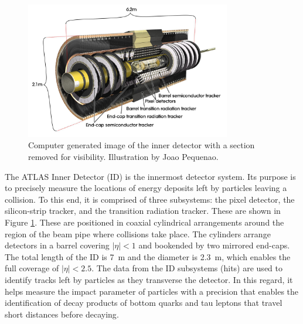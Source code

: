 \begin{figure}[h!]
\captionsetup[subfigure]{position=b}
\centering
\includegraphics[width=0.8\textwidth]{figures/experiment/atlas/id.jpg}
\caption[Computer generated image of the inner detector with a section removed for visibility. Illustration by Joao Pequenao.]{Computer generated image of the inner detector with a section removed for visibility. Illustration by Joao Pequenao\footnotemark.}
\label{fig:atlasId}
\end{figure}

The ATLAS Inner Detector (ID) is the innermost detector system.
Its purpose is to precisely measure the locations of energy deposits left by particles leaving a collision.
To this end, it is comprised of three subsystems: the pixel detector, the silicon-strip tracker, and the transition radiation tracker.
These are shown in Figure \ref{fig:atlasId}.
These are positioned in coaxial cylindrical arrangements around the region of the beam pipe where collisions take place.
The cylinders arrange detectors in a barrel covering $|\eta|<1$ and bookended by two mirrored end-caps.
The total length of the ID is 7~m and the diameter is 2.3~m, which enables the full coverage of $|\eta|<2.5$.
The data from the ID subsystems (hits) are used to identify tracks left by particles as they transverse the detector.
In this regard, it helps measure the impact parameter of particles with a precision that enables the identification of decay products of bottom quarks and tau leptons that travel short distances before decaying\cite{pixel}.


